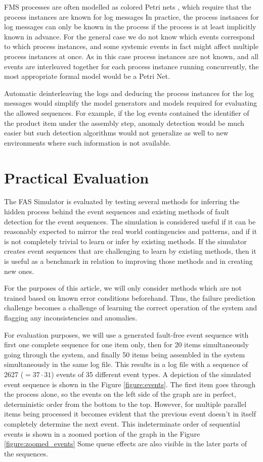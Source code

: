 \documentclass[journal]{IEEEtran}
\begin{document}
FMS processes are often modelled as colored Petri nets \cite{saitou2002robust}, which require that the process instances are known for log messages
In practice, the process instances for log messages can only be known in the process
if the process is at least implicitly known in advance. For the general case we do not know which events correspond to which process instances, and some systemic events
in fact might affect multiple process instances at once. As in this
case process instances are not known, and all events are interleaved together for each process instance running concurrently, the most appropriate formal
model would be a Petri Net.

Automatic deinterleaving the logs and deducing the process instances for the log messages would simplify the model generators and models required
for evaluating the allowed sequences.
For example, if the log events contained the identifier of the product
item under the assembly step, anomaly detection would be much easier but such detection algorithms would not generalize as well
to new environments where such information is not available.

\section{Practical Evaluation}

The FAS Simulator is evaluated by testing several methods for inferring the hidden process behind the event sequences and existing methods of fault detection for
the event sequences.
The simulation is considered useful if it can be reasonably expected to mirror the real world contingencies and patterns, and if it is not completely trivial to
learn or infer by existing methods. If the simulator creates event sequences that are challenging to learn by existing methods, then it is useful as a benchmark
in relation to improving those methods and in creating new ones.

For the purposes of this article, we will only consider methods which are not trained based on known error conditions beforehand. Thus, the failure prediction challenge
becomes a challenge of learning the correct operation of the system and flagging any inconsistencies and anomalies.

For evaluation purposes, we will use a generated fault-free event sequence with first one complete sequence for one item only, then for 20 items simultaneously going through the system,
and finally 50 items being assembled in the system simultaneously in the same log file. This results in a log file with a sequence of 2627 ($ = 37 \cdot 31 $) events of 35 different
event types. A depiction of the simulated event sequence is shown in the Figure \ref{figure:events}. The first item goes through the process alone, so the events on the left side
of the graph are in perfect, deterministic order from the bottom to the top. However, for multiple parallel items being processed it becomes evident that the previous event doesn't in itself
completely determine the next event. This indeterminate order of sequential events is shown in a zoomed portion of the graph in the Figure \ref{figure:zoomed_events}
Some queue effects are also visible in the later parts of the sequences.
\end{document}
